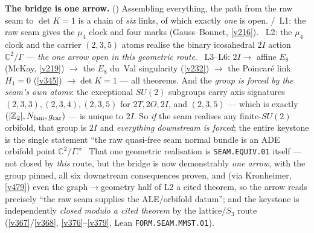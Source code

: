 \par\smallskip\noindent\textbf{The bridge is one arrow.} ()
Assembling everything, the path from the raw seam to $\det K{=}1$ is a chain of \emph{six} links, of which exactly
\emph{one} is open. \mE/\mC\ L1: the raw seam gives the $\mu_4$ clock and four marks (Gauss--Bonnet, \vref{v216}).
\mO\ L2: the $\mu_4$ clock and the carrier $(2,3,5)$ atoms realise the binary icosahedral $2I$ action
$\mathbb{C}^2/\Gamma$ --- \emph{the one arrow open in this geometric route}. \mE\ L3--L6: $2I\to$ affine $E_8$ (McKay, \vref{v219}) $\to$ the $E_8$ du~Val
singularity (\vref{v232}) $\to$ the Poincar\'e link $H_1{=}0$ (\vref{v345}) $\to\det K{=}1$ --- all theorems. And the
\emph{group is forced by the seam's own atoms}: the exceptional $SU(2)$ subgroups carry axis signatures
$(2,3,3),(2,3,4),(2,3,5)$ for $2T,2O,2I$, and $(2,3,5)$ --- which is exactly
$(|\mathbb Z_2|,N_{\mathrm{fam}},g_{\mathrm{car}})$ --- is unique to $2I$. So \emph{if} the seam realises any finite-$SU(2)$ orbifold, that group
is $2I$ and \emph{everything downstream is forced}; the entire keystone is the single statement ``the raw
quasi-free seam normal bundle is an ADE orbifold point $\mathbb{C}^2/\Gamma$.'' \mO\ That one geometric realisation is
\texttt{SEAM.EQUIV.01} itself --- not closed by \emph{this} route, but the bridge is now demonstrably \emph{one arrow},
with the group pinned, all six downstream consequences proven, and (via Kronheimer,
\vref{v479}) even the graph$\to$geometry half of L2 a cited theorem, so the arrow reads precisely ``the raw seam
supplies the ALE/orbifold datum''; and the keystone is independently \emph{closed
modulo a cited theorem} by the lattice/$S_3$ route (\vref{v367}/\vref{v368}, \vref{v376}--\vref{v379}, Lean
\texttt{FORM.SEAM.MMST.01}).

